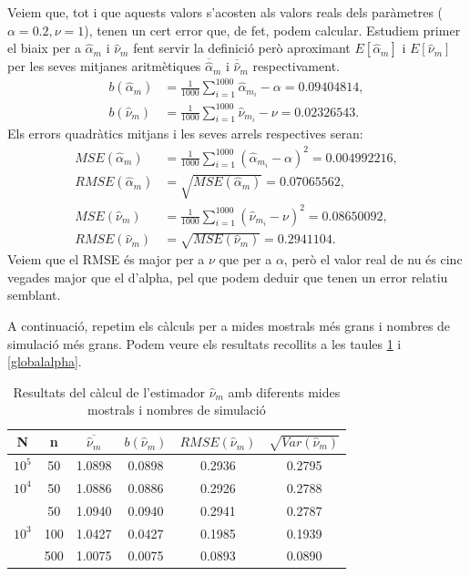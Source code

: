 \documentclass[12pt, catalan]{article}
\numberwithin{table}{section}
\numberwithin{figure}{section}
\numberwithin{equation}{section}
\begin{document}
	Veiem que, tot i que aquests valors s'acosten als valors reals dels paràmetres ($\alpha=0.2,\nu=1$), tenen un cert error que, de fet, podem calcular. Estudiem primer el biaix per a $\hat{\alpha}_m$ i $\hat{\nu}_m$ fent servir la definició però aproximant $E[\hat{\alpha}_m]$ i $E[\hat{\nu}_m]$ per les seves mitjanes aritmètiques $\overline{\hat{\alpha}}_m$ i $\overline{\hat{\nu}}_m$ respectivament.
\begin{align*}
    b(\hat{\alpha}_m)&=\frac{1}{1000}\sum_{i=1}^{1000}\hat{\alpha}_{m_i}-\alpha=0.09404814,\\
    b(\hat{\nu}_m)&=\frac{1}{1000}\sum_{i=1}^{1000}\hat{\nu}_{m_i}-\nu=0.02326543.
\end{align*}
Els errors quadràtics mitjans i les seves arrels respectives seran:
\begin{align*}
    MSE(\hat{\alpha}_m)&=\frac{1}{1000}\sum_{i=1}^{1000}(\hat{\alpha}_{m_i}-\alpha)^2=0.004992216,\\
    RMSE(\hat{\alpha}_m)&=\sqrt{MSE(\hat{\alpha}_m)}=0.07065562,\\
    MSE(\hat{\nu}_m)&=\frac{1}{1000}\sum_{i=1}^{1000}(\hat{\nu}_{m_i}-\nu)^2=0.08650092,\\
    RMSE(\hat{\nu}_m)&=\sqrt{MSE(\hat{\nu}_m)}=0.2941104.
\end{align*}
Veiem que el RMSE és major per a $\nu$ que per a $\alpha$, però el valor real de nu és cinc vegades major que el d'alpha, pel que podem deduir que tenen un error relatiu semblant. %

A continuació, repetim els càlculs per a mides mostrals més grans i nombres de simulació més grans. Podem veure els resultats recollits a les taules \ref{globalnu} i \ref{globalalpha}.

\begin{table}[h]
\centering
\caption{Resultats del càlcul de l'estimador $\hat{\nu}_m$ amb diferents mides mostrals i nombres de simulació}\vspace{0.3cm}
\begin{tabular}{|c|c|c|c|c|c|}
\hline
N                    & n   & $\overline{\hat{\nu}_m}$& $b(\hat{\nu}_m)$ & $RMSE(\hat{\nu}_m)$  & $\sqrt{Var(\hat{\nu}_m)}$ \\ \hline
$10^5$                  & 50  & 1.0898 &0.0898& 0.2936  & 0.2795   \\ \hline
$10^4$                   & 50  & 1.0886 &0.0886& 0.2926  & 0.2788   \\ \hline
\multirow{3}{*}{$10^3$ } & 50  & 1.0940 &0.0940& 0.2941  & 0.2787   \\ \cline{2-6} 
                     & 100 & 1.0427 &0.0427& 0.1985  & 0.1939   \\ \cline{2-6} 
                     & 500 & 1.0075 &0.0075& 0.0893 & 0.0890   \\ \hline
\end{tabular}
\label{globalnu}
\end{table}
\end{document}
